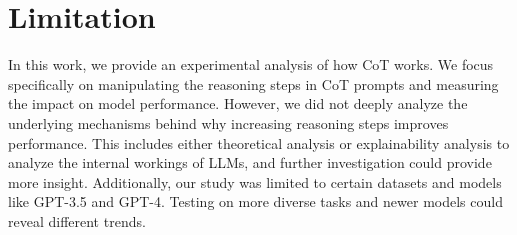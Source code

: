 \section{Limitation}
%
In this work, we provide an experimental analysis of how CoT works. We focus specifically on manipulating the reasoning steps in CoT prompts and measuring the impact on model performance. However, we did not deeply analyze the underlying mechanisms behind why increasing reasoning steps improves performance. This includes either theoretical analysis or explainability analysis to analyze the internal workings of LLMs, and further investigation could provide more insight. Additionally, our study was limited to certain datasets and models like GPT-3.5 and GPT-4. Testing on more diverse tasks and newer models could reveal different trends.


\clearpage
\appendix

\onecolumn